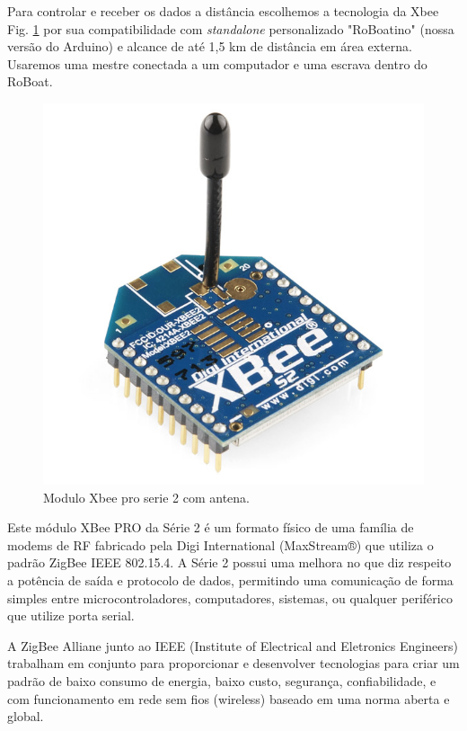 Para controlar e receber os dados a distância escolhemos a tecnologia da Xbee Fig. \ref{Xbee} por sua compatibilidade com \textit{standalone} personalizado "RoBoatino" (nossa versão do Arduino) e alcance de até 1,5 km de distância em área externa. Usaremos uma mestre conectada a um computador e uma escrava dentro do RoBoat.
 \begin{figure} [!htp]
	\centering
	\includegraphics[scale=0.5]{figuras/Xbee}
	\caption{Modulo Xbee pro serie 2 com antena.}
	\label{Xbee}
\end{figure}
\FloatBarrier
Este módulo XBee PRO da Série 2 é um formato físico de uma família de modems de RF fabricado pela Digi International (MaxStream®) que utiliza o padrão ZigBee IEEE 802.15.4. A Série 2 possui uma melhora no que diz respeito a potência de saída e protocolo de dados, permitindo uma comunicação de forma simples entre microcontroladores, computadores, sistemas, ou qualquer periférico que utilize porta serial.



A ZigBee Alliane junto ao IEEE (Institute of Electrical and Eletronics Engineers) trabalham em conjunto para proporcionar e desenvolver tecnologias para criar um padrão de baixo consumo de energia, baixo custo, segurança, confiabilidade, e com funcionamento em rede sem fios (wireless) baseado em uma norma aberta e global.



